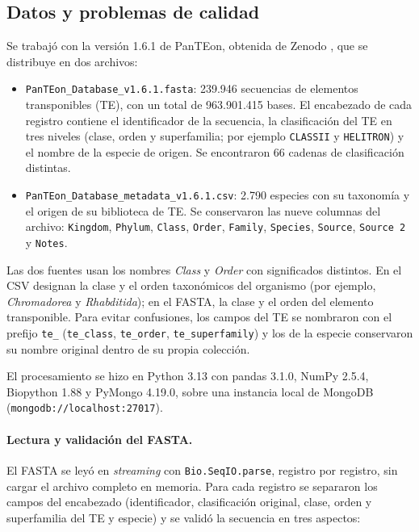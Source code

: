 \documentclass[pdflatex,lineno,referee,sn-vancouver-num]{sn-jnl}
\theoremstyle{thmstyleone}%
\theoremstyle{thmstyletwo}%
\theoremstyle{thmstylethree}%
\begin{document}
\subsection{Datos y problemas de calidad}\label{subsec:datos}

Se trabajó con la versión 1.6.1 de PanTEon, obtenida de Zenodo \cite{orozco2026panteondb}, que se distribuye en dos archivos:

\begin{itemize}
  \item \texttt{PanTEon\_Database\_v1.6.1.fasta}: 239.946 secuencias de elementos transponibles (TE), con un total de 963.901.415 bases. El encabezado de cada registro contiene el identificador de la secuencia, la clasificación del TE en tres niveles (clase, orden y superfamilia; por ejemplo \texttt{CLASSII} y \texttt{HELITRON}) y el nombre de la especie de origen. Se encontraron 66 cadenas de clasificación distintas.
  \item \texttt{PanTEon\_Database\_metadata\_v1.6.1.csv}: 2.790 especies con su taxonomía y el origen de su biblioteca de TE. Se conservaron las nueve columnas del archivo: \texttt{Kingdom}, \texttt{Phylum}, \texttt{Class}, \texttt{Order}, \texttt{Family}, \texttt{Species}, \texttt{Source}, \texttt{Source 2} y \texttt{Notes}.
\end{itemize}

Las dos fuentes usan los nombres \emph{Class} y \emph{Order} con significados distintos. En el CSV designan la clase y el orden taxonómicos del organismo (por ejemplo, \textit{Chromadorea} y \textit{Rhabditida}); en el FASTA, la clase y el orden del elemento transponible. Para evitar confusiones, los campos del TE se nombraron con el prefijo \texttt{te\_} (\texttt{te\_class}, \texttt{te\_order}, \texttt{te\_superfamily}) y los de la especie conservaron su nombre original dentro de su propia colección.

El procesamiento se hizo en Python 3.13 con pandas 3.1.0, NumPy 2.5.4, Biopython 1.88 \cite{cock2009biopython} y PyMongo 4.19.0, sobre una instancia local de MongoDB (\texttt{mongodb://localhost:27017}).

\paragraph{Lectura y validación del FASTA.} El FASTA se leyó en \emph{streaming} con \texttt{Bio.SeqIO.parse}, registro por registro, sin cargar el archivo completo en memoria. Para cada registro se separaron los campos del encabezado (identificador, clasificación original, clase, orden y superfamilia del TE y especie) y se validó la secuencia en tres aspectos:
\end{document}
